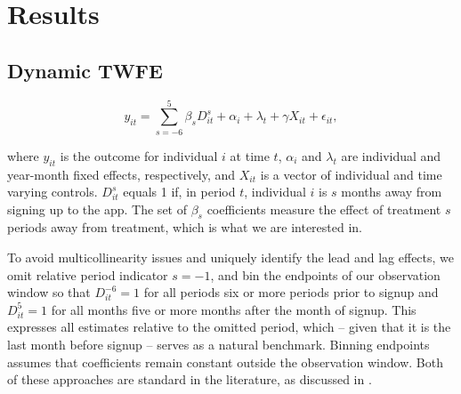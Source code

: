
\section{Results}%
\label{sec:results}


\subsection{Dynamic TWFE}%
\label{sub:dynamic_results}

\begin{equation}
\label{eq:dynamic_twfe}
    y_{it} = \sum^{5}_{s=-6} \beta_s D_{it}^s + \alpha_i + \lambda_t + \gamma X_{it} + \epsilon_{it},
\end{equation}

where $y_{it}$ is the outcome for individual $i$ at time $t$, $\alpha_i$ and
$\lambda_t$ are individual and year-month fixed effects, respectively, and
$X_{it}$ is a vector of individual and time varying controls. $D_{it}^s$ equals
1 if, in period $t$, individual $i$ is $s$ months away from signing up to the
app. The set of $\beta_s$ coefficients measure the effect of treatment $s$
periods away from treatment, which is what we are interested in.

To avoid multicollinearity issues and uniquely identify the lead and lag
effects, we omit relative period indicator $s = -1$, and bin the endpoints of our
observation window so that $D_{it}^{-6} = 1$ for all periods six or more
periods prior to signup and $D_{it}^{5} = 1$ for all months five or more months
after the month of signup. This expresses all estimates relative to the omitted
period, which -- given that it is the last month before signup -- serves as a
natural benchmark. Binning endpoints assumes that coefficients remain constant
outside the observation window. Both of these approaches are standard in the
literature, as discussed in \citet{sun2021estimating, schmidheiny2019event}.



